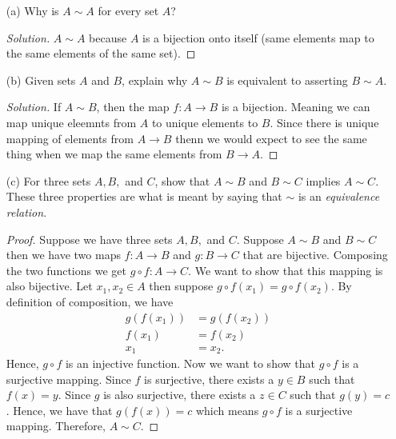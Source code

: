 \begin{enumerate}
    \item[(a)] Why is \( A \sim A \) for every set \( A \)? 
    \begin{proof}[Solution]
    \( A \sim A \) because \( A \) is a bijection onto itself (same elements map to the same elements of the same set). 
    \end{proof}
    \item[(b)] Given sets \( A \) and \( B \), explain why \( A \sim B \) is equivalent to asserting \( B \sim A \).
    \begin{proof}[Solution]
    If \( A \sim B \), then the map \( f: A \to B \) is a bijection. Meaning we can map unique eleemnts from \( A \) to unique elements to \( B \). Since there is unique mapping of elements from \( A \to B \) thenn we would expect to see the same thing when we map the same elements from \( B \to A \). 
    \end{proof}
    \item[(c)] For three sets \( A, B, \) and \( C \), show that \( A \sim B \) and \( B \sim C \) implies \( A \sim C \). These three properties are what is meant by saying that \( \sim \) is an \textit{equivalence relation}.
    \begin{proof}
     Suppose we have three sets \( A, B, \) and \( C \). Suppose \( A \sim B \) and \( B \sim C \)
     then we have two maps \( f: A \to B \) and \( g: B \to C \) that are bijective. Composing the two functions we get \( g \circ f : A \to C \). We want to show that this mapping is also bijective. Let \( x_1, x_2 \in A \) then suppose \( g \circ f (x_1) = g \circ f (x_2) \). By definition of composition, we have 
     \begin{align*}
     g(f(x_1))&= g(f(x_2)) \\
     f(x_1) &= f(x_2)  \tag{ \( g \) is injective } \\ 
     x_1 &= x_2.       \tag{ \( f \) is injective }
     \end{align*}
     Hence, \( g \circ f \) is an injective function. Now we want to show that \( g \circ f \) is a surjective mapping. Since \( f \) is surjective, there exists a \( y \in B \) such that \( f(x) = y \). Since \( g \) is also surjective, there exists a \( z \in C \) such that \( g(y) = c\). Hence, we have that \( g(f(x)) = c \) which means \( g \circ f \) is a surjective mapping. Therefore, \( A \sim C\).   
 \end{proof}

\end{enumerate}


